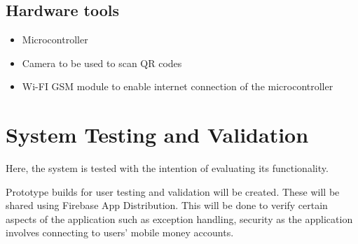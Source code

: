 \subsection{Hardware tools}
\begin{itemize}
    \item Microcontroller
    \item Camera to be used to scan QR codes
    \item Wi-FI GSM module to enable internet connection of the microcontroller
\end{itemize}


\section{System Testing and Validation}
Here,  the system is tested with the intention of evaluating its functionality. \cite{klaus_requirements_nodate}
\par
Prototype builds for user testing and validation will be created. These will be shared using Firebase App Distribution\cite{google_firebase_2020}. This will be done to verify certain aspects of the application such as exception handling, security as the application involves connecting to users' mobile money accounts.